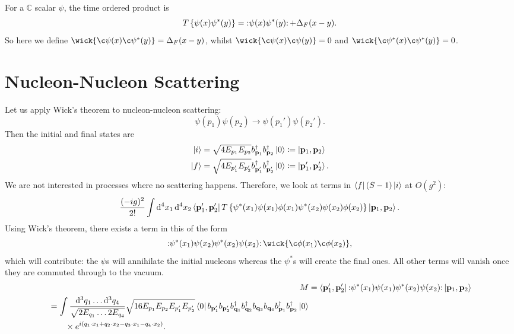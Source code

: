 \begin{example}[]
  For a $\mathbb{C}$ scalar $\psi$, the time ordered product is
  \begin{equation}
    T \left\{ \psi(x) \psi^*(y) \right\} = \mathop{:}\nolimits\!\psi(x) \psi^*(y) \!\mathop{:}\nolimits + \Delta_F(x - y).
  \end{equation}
  So here we define $ \wick{\c\psi(x)\c\psi^*(y)} = \Delta_F(x - y)$, whilst $\wick{\c\psi(x)\c\psi(y)} = 0$ and $\wick{\c\psi^*(x)\c\psi^*(y)} = 0$.
\end{example}

\section{Nucleon-Nucleon Scattering}%
\label{sec:nucleon_nucleon_scattering}

Let us apply Wick's theorem to nucleon-nucleon scattering:
\begin{equation}
  \psi(p_1) \psi(p_2) \to \psi(p_1') \psi(p_2').
\end{equation}
Then the initial and final states are
\begin{align}
  \ket{i} &= \sqrt{4 E_{p_1} E_{p_2}} b_{\vb{p}_1}^{\dagger} b_{\vb{p}_2}^{\dagger} \ket{0} \coloneqq \ket{\vb{p}_1, \vb{p}_2} \\
  \ket{f} &= \sqrt{4 E_{p_1'} E_{p_2'}} b^{\dagger}_{\vb{p}_1'} b^{\dagger}_{\vb{p}_2'} \ket{0} \coloneqq \ket{\vb{p}_1', \vb{p}_2'}.
\end{align}
We are not interested in processes where no scattering happens. Therefore, we look at terms in $\bra{f}(S-1)\ket{i}$ at $O(g^2)$:
\begin{equation}
  \frac{(-ig)^2}{2!} \int \dd[4]{x_1} \dd[4]{x_2} \bra{\vb{p}_1', \vb{p}_2'} T \left\{ \psi^*(x_1) \psi(x_1) \phi(x_1) \psi^*(x_2) \psi(x_2) \phi(x_2) \right\} \ket{\vb{p}_1, \vb{p}_2}.
\end{equation}
Using Wick's theorem, there exists a term in this of the form
\begin{equation}
  \normalorder{\psi^* (x_1) \psi(x_2) \psi^*(x_2) \psi(x_2) } \wick{\c\phi(x_1)\c\phi(x_2)},
\end{equation}
which will contribute: the $\psi$s will annihilate the initial nucleons whereas the $\psi^*$s will create the final ones. All other terms will vanish once they are commuted through to the vacuum.
\begin{align}
  M &=\bra{\vb{p}_1', \vb{p}_2'} \mathop{:}\nolimits\!\psi^*(x_1) \psi(x_1) \psi^*(x_2) \psi(x_2) \!\mathop{:}\nolimits \ket{\vb{p}_1, \vb{p}_2} \\
  \begin{split}
    &= \int \frac{\dd[3]{q_1} \dots \dd[3]{q_4}}{\sqrt{2 E_{q_1} \dots 2E_{q_4}}} \sqrt{16 E_{p_1} E_{p_2} E_{p_1'} E_{p_2'}} \bra{0} b_{\vb{p}_1'} b_{\vb{p}_2'} b^{\dagger}_{\vb{q}_1} b^{\dagger}_{\vb{q}_2} b_{\vb{q}_3} b_{\vb{q}_4} b^{\dagger}_{\vb{p}_1} b^{\dagger}_{\vb{p}_2} \ket{0} \\
    & \qquad \times e^{i (q_1 \cdot x_1 + q_2 \cdot x_2 - q_3 \cdot x_1 - q_4 \cdot x_2)}.
  \end{split}
\end{align}
